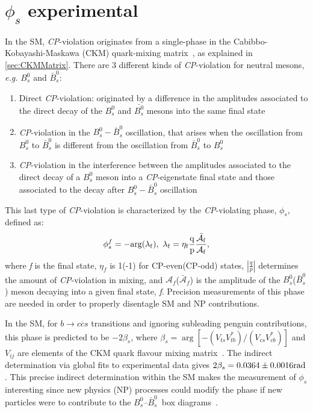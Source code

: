 \section{$\phi_s$ experimental} %
\label{sec:phisEXP}

In the SM, \textit{CP}-violation originates from a single-phase in the Cabibbo-Kobayashi-Maskawa (CKM) quark-mixing matrix~\cite{Charles:2011va}, as explained in \ref{sec:CKMMatrix}. There are 3 different kinds of \textit{CP}-violation for neutral mesons, \textit{e.g.} $B_s^0$ and $\bar{B}_s^0$:
\begin{enumerate}
\item Direct \textit{CP}-violation: originated by a difference in the amplitudes associated to the direct decay of the $B_s^0$ and $\bar{B_s^0}$ mesons into the same final state %
\item \textit{CP}-violation in the $B_s^0- \bar{B}_s^0$ oscillation, that arises when the oscillation from $B_s^0$ to $\bar{B}_s^0$ is different from the oscillation from $\bar{B}_s^0$ to $B_s^0$
\item \textit{CP}-violation in the interference between the amplitudes  associated to the direct decay of a $B_s^0$ meson into a \textit{CP}-eigenstate final state and those associated to the decay after $B_s^0- \bar{B}_s^0$ oscillation
\end{enumerate} 
This last type of \textit{CP}-violation is characterized by the \textit{CP}-violating phase, $\phi_s$, defined as:
\begin{equation}
 \label{eq:phis}
\phi_s^f = -\rm arg(\lambda_f),\ \lambda_f = \eta_f \frac{q}{p}\frac{\bar{\mathcal{A}}_f}{\mathcal{A}_f},
\end{equation}
where \textit{f} is the final state, $\eta_f$ is 1(-1) for CP-even(CP-odd) states, $\left| \frac{q}{p} \right |$ determines the amount of \textit{CP}-violation in mixing, and ${\mathcal{A}}_f$($\bar{\mathcal{A}}_f$) is the amplitude of the $B_s^0$($\bar{B}_s^0$) meson decaying into a given final state, \textit{f}.
Precision measurements of this phase are needed in order to properly disentagle SM and NP contributions.

 In the SM, for $b\to c\overline{c}s$ transitions and ignoring subleading penguin contributions, this phase is predicted to be $-2\beta_s$, where $\beta_s=\arg\left[
 - (V_{ts} V_{tb}^*) / (V_{cs} V_{cb}^*)\right]$ and $V_{ij}$ are elements of the CKM quark flavour mixing
 matrix~\cite{Kobayashi:1973fv,Cabibbo:1963yz}. The indirect determination via global fits to experimental data gives
 \mbox{$2\beta_s=0.0364\pm0.0016\rm rad$}. This precise indirect determination within the SM makes the
 measurement of $\phi_s$ interesting since new physics (NP) processes could modify
 the phase if new particles were to contribute to the $B_s^0$--$\bar{B}_s^0$\ box diagrams~\cite{Buras:2009if,Chiang:2009ev}.
 
